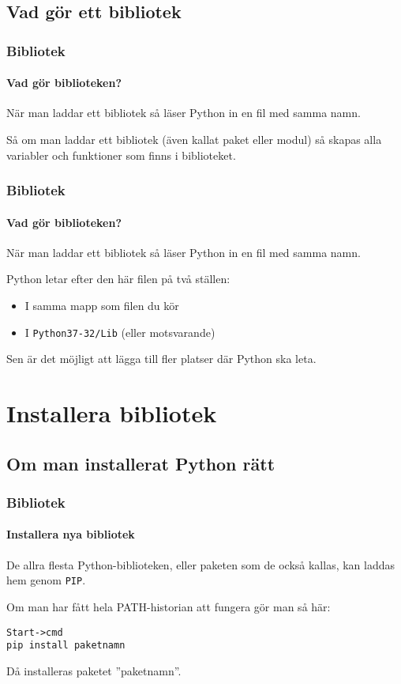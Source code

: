 \documentclass{beamer}
\begin{document}
\subsection{Vad gör ett bibliotek}

\begin{frame}
	\frametitle{Bibliotek}
	\framesubtitle{Vad gör biblioteken?}
	
	När man laddar ett bibliotek så läser Python in en fil med samma namn.
	
	Så om man laddar ett bibliotek (även kallat paket eller modul) så skapas alla variabler och funktioner som finns i biblioteket.

\end{frame}

\begin{frame}
	\frametitle{Bibliotek}
	\framesubtitle{Vad gör biblioteken?}
	
	När man laddar ett bibliotek så läser Python in en fil med samma namn.
	
	Python letar efter den här filen på två ställen:
	
	\begin{itemize}
	\item I samma mapp som filen du kör
	\item I \texttt{Python37-32/Lib} (eller motsvarande)
	\end{itemize}
	
	Sen är det möjligt att lägga till fler platser där Python ska leta.

\end{frame}

\section{Installera bibliotek}

\subsection{Om man installerat Python rätt}

\begin{frame}[fragile]
	\frametitle{Bibliotek}
	\framesubtitle{Installera nya bibliotek}
	
	De allra flesta Python-biblioteken, eller paketen som de också kallas, kan laddas hem genom \texttt{PIP}.
	
	Om man har fått hela PATH-historian att fungera gör man så här:
	
	\begin{verbatim}
Start->cmd
pip install paketnamn
	\end{verbatim}
	
	Då installeras paketet ''paketnamn''.

\end{frame}
\end{document}
